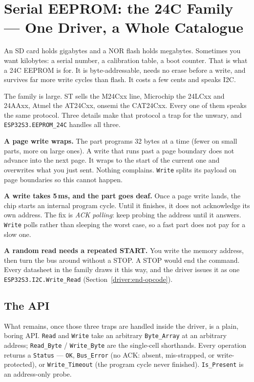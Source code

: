 \chapter[Serial EEPROM: the 24C Family]%
        {Serial EEPROM: the 24C Family --- One Driver, a Whole Catalogue}
\label{ch:eeprom}

An SD card holds gigabytes and a NOR flash holds megabytes. Sometimes you want
kilobytes: a serial number, a calibration table, a boot counter. That is what a
24C EEPROM is for. It is byte-addressable, needs no erase before a write, and
survives far more write cycles than flash. It costs a few cents and speaks I2C.

The family is large. ST sells the M24Cxx line, Microchip the 24LCxx and 24AAxx,
Atmel the AT24Cxx, onsemi the CAT24Cxx. Every one of them speaks the same
protocol. Three details make that protocol a trap for the unwary, and
\texttt{ESP32S3.EEPROM\_24C} handles all three.

\textbf{A page write wraps.} The part programs 32 bytes at a
time (fewer on small parts, more on large ones). A write that runs past a page
boundary does not advance into the next page. It wraps to the start of the
current one and overwrites what you just sent. Nothing complains. \texttt{Write}
splits its payload on page boundaries so this cannot happen.

\textbf{A write takes 5\,ms, and the part goes deaf.} Once a
page write lands, the chip starts an internal program cycle. Until it finishes, it
does not acknowledge its own address. The fix is \emph{ACK polling}: keep probing
the address until it answers. \texttt{Write} polls rather than sleeping the worst
case, so a fast part does not pay for a slow one.

\textbf{A random read needs a repeated START.} You write the memory address, then
turn the bus around without a STOP. A STOP would end the command. Every datasheet
in the family draws it this way, and the driver issues it as one
\texttt{ESP32S3.I2C.Write\_Read} (Section~\ref{driver:end-opcode}).

\section{The API}

What remains, once those three traps are handled inside the driver, is a plain,
boring API. \texttt{Read} and \texttt{Write} take an arbitrary
\texttt{Byte\_Array} at an arbitrary address; \texttt{Read\_Byte} /
\texttt{Write\_Byte} are the single-cell shorthands. Every operation returns a
\texttt{Status} --- \texttt{OK}, \texttt{Bus\_Error} (no ACK: absent,
mis-strapped, or write-protected), or \texttt{Write\_Timeout} (the program cycle
never finished). \texttt{Is\_Present} is an address-only probe.

